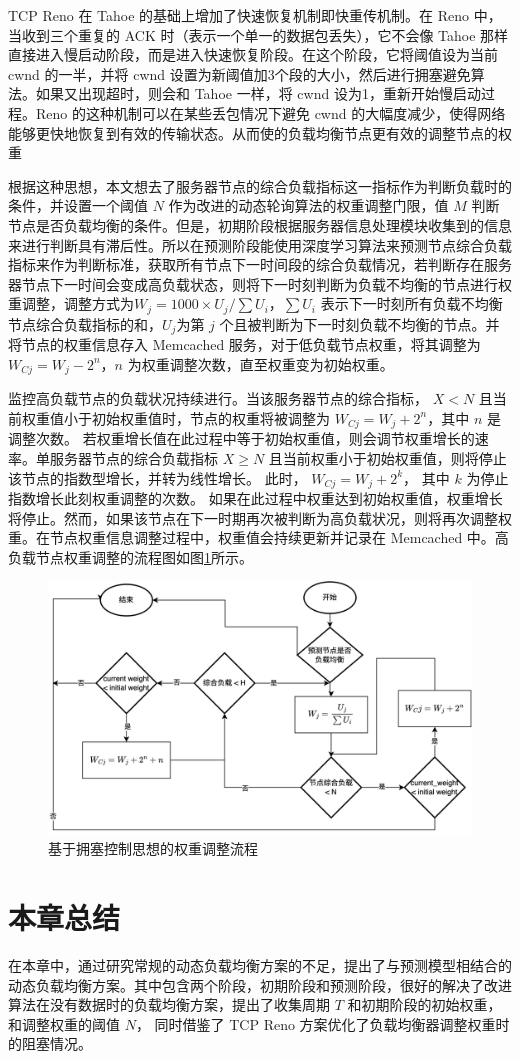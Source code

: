 TCP Reno 在 Tahoe 的基础上增加了快速恢复机制即快重传机制。在 Reno 中，当收到三个重复的 ACK 时（表示一个单一的数据包丢失），它不会像 Tahoe 那样直接进入慢启动阶段，而是进入快速恢复阶段。在这个阶段，它将阈值设为当前 cwnd 的一半，并将 cwnd 设置为新阈值加3个段的大小，然后进行拥塞避免算法。如果又出现超时，则会和 Tahoe 一样，将 cwnd 设为1，重新开始慢启动过程。Reno 的这种机制可以在某些丢包情况下避免 cwnd 的大幅度减少，使得网络能够更快地恢复到有效的传输状态。从而使的负载均衡节点更有效的调整节点的权重

根据这种思想，本文想去了服务器节点的综合负载指标这一指标作为判断负载时的条件，并设置一个阈值 $N$ 作为改进的动态轮询算法的权重调整门限，值 $M$ 判断节点是否负载均衡的条件。但是，初期阶段根据服务器信息处理模块收集到的信息来进行判断具有滞后性。所以在预测阶段能使用深度学习算法来预测节点综合负载指标来作为判断标准，获取所有节点下一时间段的综合负载情况，若判断存在服务器节点下一时间会变成高负载状态，则将下一时刻判断为负载不均衡的节点进行权重调整，调整方式为$W_j = 1000 \times U_j / \sum U_i$，$\sum U_i$ 表示下一时刻所有负载不均衡节点综合负载指标的和，$U_j$为第 $j$ 个且被判断为下一时刻负载不均衡的节点。并将节点的权重信息存入 Memcached 服务，对于低负载节点权重，将其调整为 $W_{Cj} = W_j - 2^n$，$n$ 为权重调整次数，直至权重变为初始权重。

监控高负载节点的负载状况持续进行。当该服务器节点的综合指标， $X < N$ 且当前权重值小于初始权重值时，节点的权重将被调整为 $W_{Cj} = W_j + 2^n$，其中 $n$ 是调整次数。
若权重增长值在此过程中等于初始权重值，则会调节权重增长的速率。单服务器节点的综合负载指标 $X \ge N$ 且当前权重小于初始权重值，则将停止该节点的指数型增长，并转为线性增长。 此时， $W_{Cj} = W_j + 2^k$， 其中 $k$ 为停止指数增长此刻权重调整的次数。
如果在此过程中权重达到初始权重值，权重增长将停止。然而，如果该节点在下一时期再次被判断为高负载状况，则将再次调整权重。在节点权重信息调整过程中，权重值会持续更新并记录在 Memcached 中。高负载节点权重调整的流程图如图\ref{contral_weight}所示。

\begin{figure}[htbp]
	\centering
	\includegraphics[width=.9\textwidth]{figures/change_weight.png}
	\caption{基于拥塞控制思想的权重调整流程}
	\label{contral_weight}
\end{figure}

\section{本章总结}

在本章中，通过研究常规的动态负载均衡方案的不足，提出了与预测模型相结合的动态负载均衡方案。其中包含两个阶段，初期阶段和预测阶段，很好的解决了改进算法在没有数据时的负载均衡方案，提出了收集周期 $T$ 和初期阶段的初始权重，和调整权重的阈值 $N$，
同时借鉴了 TCP Reno 方案优化了负载均衡器调整权重时的阻塞情况。
